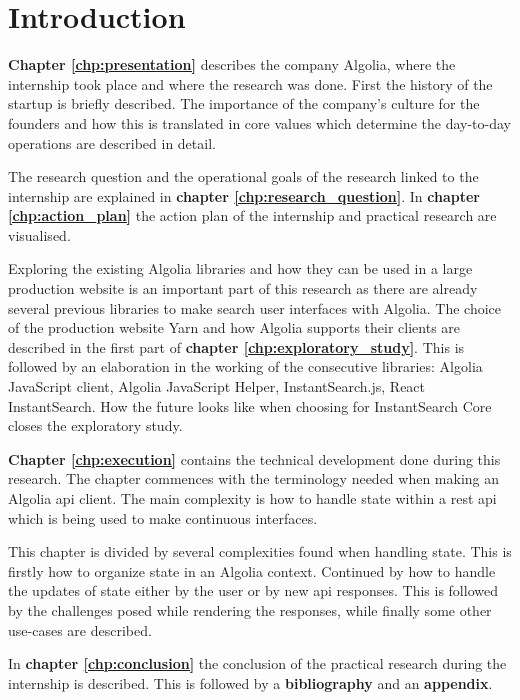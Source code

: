 
\chapter{Introduction} %
\label{chp:introduction}

\textbf{Chapter \ref{chp:presentation}} describes the company Algolia, where the internship took place and where the research was done. First the history of the startup is briefly described. The importance of the company's culture for the founders and how this is translated in core values which determine the day-to-day operations are described in detail.

The research question and the operational goals of the research linked to the internship are explained in \textbf{chapter \ref{chp:research_question}}. 
In \textbf{chapter \ref{chp:action_plan}} the action plan of the internship and practical research are visualised.

Exploring the existing Algolia libraries and how they can be used in a large production website is an important part of this research as there are already several previous libraries to make search user interfaces with Algolia. The choice of the production website Yarn\cite{yarn-site} and how Algolia supports their clients are described in the first part of \textbf{chapter \ref{chp:exploratory_study}}. This is followed by an elaboration in the working of the consecutive libraries: Algolia JavaScript client, Algolia JavaScript Helper, InstantSearch.js, React InstantSearch. How the future looks like when choosing for InstantSearch Core closes the exploratory study.

\textbf{Chapter \ref{chp:execution}} contains the technical development done during this research. The chapter commences with the terminology needed when making an Algolia \acrshort{api} client. The main complexity is how to handle state within a \acrfull{rest} \acrshort{api} which is being used to make continuous interfaces. 

This chapter is divided by several complexities found when handling state. This is firstly how to organize state in an Algolia context. Continued by how to handle the updates of state either by the user or by new \acrshort{api} responses. This is followed by the challenges posed while rendering the responses, while finally some other use-cases are described.

In \textbf{chapter \ref{chp:conclusion}} the conclusion of the practical research during the internship is described. This is followed by a \textbf{bibliography} and an \textbf{appendix}.
